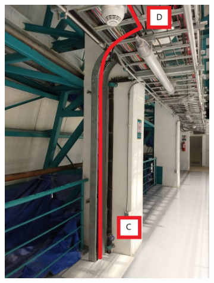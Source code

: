  \begin{figure}
    \centering
    \begin{subfigure}{0.45\textwidth}
      \centering
      \includegraphics[width=\textwidth]{images/14.jpg}
    \end{subfigure}
    \hfill
    \begin{subfigure}{0.45\textwidth}
      \centering

\end{subfigure}
\end{figure}
